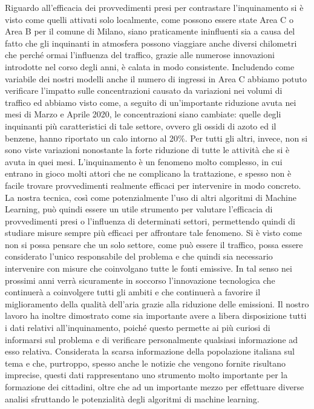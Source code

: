 Riguardo all'efficacia dei provvedimenti presi per contrastare l'inquinamento si è visto come quelli attivati solo localmente, come possono essere state Area C o Area B per il comune di Milano, siano praticamente ininfluenti sia a causa del fatto che gli inquinanti in atmosfera possono viaggiare anche diversi chilometri che perché ormai l'influenza del traffico, grazie alle numerose innovazioni introdotte nel corso degli anni, è calata in modo consistente. Includendo come variabile dei nostri modelli anche il numero di ingressi in Area C abbiamo potuto verificare l'impatto sulle concentrazioni causato da variazioni nei volumi di traffico ed abbiamo visto come, a seguito di un'importante riduzione avuta nei mesi di Marzo e Aprile 2020, le concentrazioni siano cambiate: quelle degli inquinanti più caratteristici di tale settore, ovvero gli ossidi di azoto ed il benzene, hanno riportato un calo intorno al 20\%. Per tutti gli altri, invece, non si sono viste variazioni nonostante la forte riduzione di tutte le attività che si è avuta in quei mesi.
L'inquinamento è un fenomeno molto complesso, in cui entrano in gioco molti attori che ne complicano la trattazione, e spesso non è facile trovare provvedimenti realmente efficaci per intervenire in modo concreto. La nostra tecnica, così come potenzialmente l'uso di altri algoritmi di Machine Learning, può quindi essere un utile strumento per valutare l'efficacia di provvedimenti presi o l'influenza di determinati settori, permettendo quindi di studiare misure sempre più efficaci per affrontare tale fenomeno. Si è visto come non si possa pensare che un solo settore, come può essere il traffico, possa essere considerato l'unico responsabile del problema e che quindi sia necessario intervenire con misure che coinvolgano tutte le fonti emissive. In tal senso nei prossimi anni verrà sicuramente in soccorso l'innovazione tecnologica che continuerà a coinvolgere tutti gli ambiti e che continuerà a favorire il miglioramento della qualità dell'aria grazie alla riduzione delle emissioni.  
Il nostro lavoro ha inoltre dimostrato come sia importante avere a libera disposizione tutti i dati relativi all'inquinamento, poiché questo permette ai più curiosi di informarsi sul problema e di verificare personalmente qualsiasi informazione ad esso relativa. Considerata la scarsa informazione della popolazione italiana sul tema e che, purtroppo, spesso anche le notizie che vengono fornite risultano imprecise, questi dati rappresentano uno strumento molto importante per la formazione dei cittadini, oltre che ad un importante mezzo per effettuare diverse analisi sfruttando le potenzialità degli algoritmi di machine learning.


